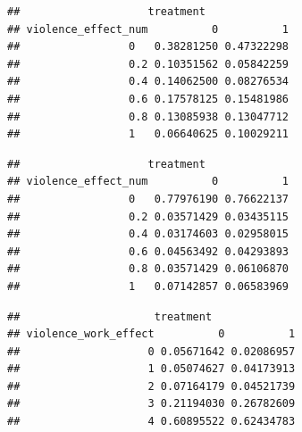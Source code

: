 \documentclass[
]{article}
\newenvironment{Shaded}{\begin{snugshade}}{\end{snugshade}}
\newcommand{\CommentTok}[1]{\textcolor[rgb]{0.56,0.35,0.01}{\textit{#1}}}
\newcommand{\DecValTok}[1]{\textcolor[rgb]{0.00,0.00,0.81}{#1}}
\newcommand{\FunctionTok}[1]{\textcolor[rgb]{0.00,0.00,0.00}{#1}}
\newcommand{\NormalTok}[1]{#1}
\newcommand{\SpecialCharTok}[1]{\textcolor[rgb]{0.00,0.00,0.00}{#1}}
\begin{document}
\begin{verbatim}
##                    treatment
## violence_effect_num          0          1
##                 0   0.38281250 0.47322298
##                 0.2 0.10351562 0.05842259
##                 0.4 0.14062500 0.08276534
##                 0.6 0.17578125 0.15481986
##                 0.8 0.13085938 0.13047712
##                 1   0.06640625 0.10029211
\end{verbatim}

\begin{Shaded}
\end{Shaded}

\begin{verbatim}
##                    treatment
## violence_effect_num          0          1
##                 0   0.77976190 0.76622137
##                 0.2 0.03571429 0.03435115
##                 0.4 0.03174603 0.02958015
##                 0.6 0.04563492 0.04293893
##                 0.8 0.03571429 0.06106870
##                 1   0.07142857 0.06583969
\end{verbatim}

\begin{Shaded}
\end{Shaded}

\begin{verbatim}
##                     treatment
## violence_work_effect          0          1
##                    0 0.05671642 0.02086957
##                    1 0.05074627 0.04173913
##                    2 0.07164179 0.04521739
##                    3 0.21194030 0.26782609
##                    4 0.60895522 0.62434783
\end{verbatim}

\begin{Shaded}
\end{Shaded}
\end{document}
